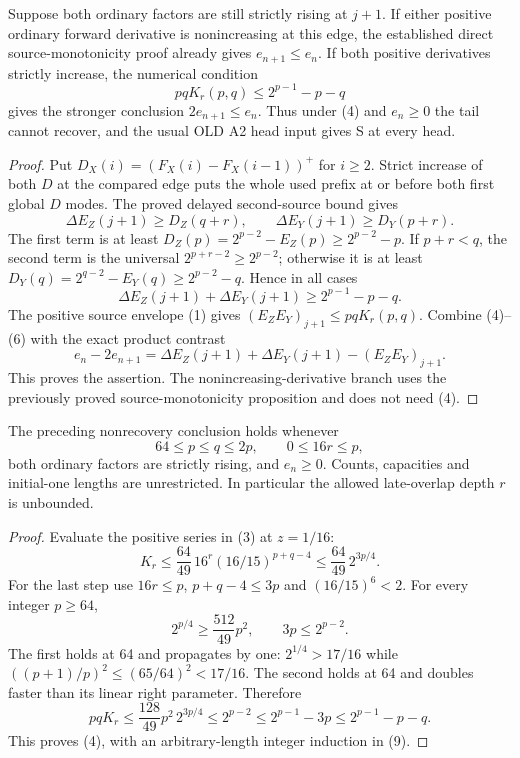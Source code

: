 \begin{theorem}
Suppose both ordinary factors are still strictly rising at $j+1$.
If either positive ordinary forward derivative is nonincreasing
at this edge, the established direct source-monotonicity proof
already gives $e_{n+1}\le e_n$.  If both positive derivatives
strictly increase, the numerical condition
\[
                 pqK_r(p,q)\le2^{p-1}-p-q              \tag{4}
\]
gives the stronger conclusion $2e_{n+1}\le e_n$.
Thus under (4) and $e_n\ge0$ the tail cannot recover, and the
usual OLD A2 head input gives S at every head.
\end{theorem}
\begin{proof}
Put $D_X(i)=(F_X(i)-F_X(i-1))^+$ for $i\ge2$.
Strict increase of both $D$ at the compared edge puts the whole
used prefix at or before both first global $D$ modes.  The proved
delayed second-source bound gives
\[
 \Delta E_Z(j+1)\ge D_Z(q+r),\qquad
 \Delta E_Y(j+1)\ge D_Y(p+r).                          \tag{5}
\]
The first term is at least $D_Z(p)=2^{p-2}-E_Z(p)
\ge2^{p-2}-p$.  If $p+r<q$, the second term is the universal
$2^{p+r-2}\ge2^{p-2}$; otherwise it is at least
$D_Y(q)=2^{q-2}-E_Y(q)\ge2^{p-2}-q$.  Hence in all cases
\[
             \Delta E_Z(j+1)+\Delta E_Y(j+1)
                            \ge2^{p-1}-p-q.            \tag{6}
\]
The positive source envelope (1) gives
$(E_ZE_Y)_{j+1}\le pqK_r(p,q)$.  Combine (4)--(6) with the
exact product contrast
\[
 e_n-2e_{n+1}
 =\Delta E_Z(j+1)+\Delta E_Y(j+1)-(E_ZE_Y)_{j+1}.
\]
This proves the assertion.  The nonincreasing-derivative branch
uses the previously proved source-monotonicity proposition and
does not need (4).
\end{proof}

\begin{corollary}
The preceding nonrecovery conclusion holds whenever
\[
              64\le p\le q\le2p,\qquad0\le16r\le p,  \tag{7}
\]
both ordinary factors are strictly rising, and $e_n\ge0$.
Counts, capacities and initial-one lengths are unrestricted.
In particular the allowed late-overlap depth $r$ is unbounded.
\end{corollary}
\begin{proof}
Evaluate the positive series in (3) at $z=1/16$:
\[
 K_r\le\frac{64}{49}\,16^r(16/15)^{p+q-4}
       \le\frac{64}{49}\,2^{3p/4}.                   \tag{8}
\]
For the last step use $16r\le p$, $p+q-4\le3p$ and
$(16/15)^6<2$.  For every integer $p\ge64$,
\[
 2^{p/4}\ge\frac{512}{49}p^2,\qquad3p\le2^{p-2}.   \tag{9}
\]
The first holds at 64 and propagates by one: $2^{1/4}>17/16$
while $((p+1)/p)^2\le(65/64)^2<17/16$.
The second holds at 64 and doubles faster than its linear right
parameter.  Therefore
\[
 pqK_r\le\frac{128}{49}p^2\,2^{3p/4}
       \le2^{p-2}\le2^{p-1}-3p\le2^{p-1}-p-q.
\]
This proves (4), with an arbitrary-length integer induction in (9).
\end{proof}


